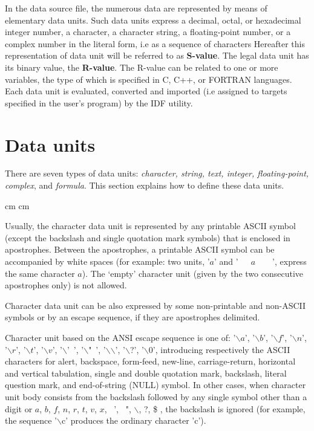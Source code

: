 In the data source file, the numerous data are represented by means of
elementary data units.
Such data units express a decimal, octal, or hexadecimal integer number,
a character, a character string, a floating-point number, or a complex number 
in the literal form, i.e as a sequence of characters
Hereafter this representation of data unit 
will be referred to as {\bf S-value}.
The legal data unit has its binary value, the {\bf R-value}. 
The R-value can be related to one or more variables, 
the type of which is specified in C, C++, or FORTRAN languages.
Each data unit is evaluated, converted and imported
(i.e assigned to targets specified in the user's program)
by the IDF utility. 

\section*{Data units}

There are seven types of data units:
{\it character, string, text, integer, floating-point, complex},
and {\it formula}.
This section explains how to define these data units.

 cm
 cm

Usually, the character data unit is represented by any printable ASCII symbol
(except the backslash and single quotation mark symbols)
that is enclosed in apostrophes.
Between the apostrophes, a printable ASCII symbol can be
accompanied by white spaces (for example: two units, '$a$' and '~~~$a$~~~~', 
express the same character $a$).  
The `empty' character unit (given by the two consecutive apostrophes only)
is not allowed.

Character data unit can be also expressed by some non-printable
and non-ASCII symbols or by an escape sequence, if they are apostrophes delimited.

Character unit based on the ANSI escape sequence is one of:\hfil\break
{ 
'$\backslash a$', '$\backslash b$', '$\backslash f$', '$\backslash n$',
'$\backslash r$', '$\backslash t$', '$\backslash v$', '$\backslash$'\ ',
'$\backslash$"\ ', '$\backslash$$\backslash$', '$\backslash$?', '$\backslash$0',
}\hfil\break
introducing respectively the ASCII characters
for alert, backspace, form-feed,
new-line, carriage-return, horizontal and vertical tabulation,
single and double quotation mark, backslash, literal question mark,
and end-of-string (NULL) symbol.
In other cases, when character unit body consists from the backslash
followed by any single symbol other than a digit or 
$a$, $b$, $f$, $n$, $r$, $t$, $v$, $x$, \ ', \ ", $\backslash$, ?, \$ ,
the backslash is ignored (for example, the sequence '$\backslash$c' 
produces the ordinary character 'c').

